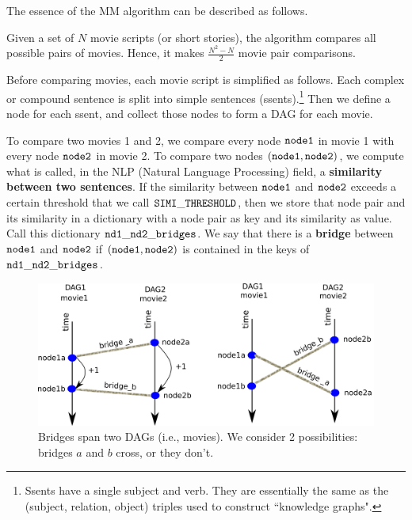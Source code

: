 \documentclass[12pt]{article}
\begin{document}
The essence of the MM algorithm can be described as follows.

Given a set of $N$ movie scripts (or short stories),
the algorithm compares all possible pairs of movies.
Hence, it makes $\frac{N^2-N}{2}$
 movie pair comparisons.

Before comparing movies, each movie script is simplified as follows.
Each complex or compound sentence is split into simple sentences (ssents).\footnote{Ssents
have a single subject and verb. They are essentially
the same as the (subject, relation, object) triples
used to construct ``knowledge graphs".}
Then we define a node for each ssent, and collect those nodes to form a DAG for each movie.



To compare two movies 1 and 2,
we compare every node $\tt node1$
in movie 1 with every node $\tt node2$ in movie 2.
To compare two nodes $\tt (node1, node2)$,
we compute what is called, in the NLP (Natural Language Processing)
field, a {\bf similarity between two sentences}. 
If the similarity
between $\tt node1$ and $\tt node2$ exceeds a certain threshold
that we call $\tt SIMI\_THRESHOLD$,
then we store that node pair and its
similarity in a dictionary with
a node pair as key and its similarity 
as value. Call this dictionary $\tt nd1\_nd2\_bridges$.
We say that there is a {\bf bridge} 
between $\tt node1$ and $\tt node2$
if $\tt (node1, node2)$ is contained 
in the keys of $\tt nd1\_nd2\_bridges$.

\begin{figure}[h!]
\centering
\includegraphics[width=5in]
{crossing-bridges.png}
\caption{Bridges span two DAGs (i.e., movies). We consider 2 possibilities:
bridges $a$ and $b$ cross,
or they don't. 
}
\label{fig-crossing-bridges}
\end{figure}
\end{document}
